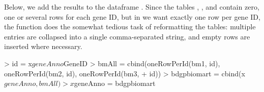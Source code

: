 %
Below, we add the results
to the dataframe . Since the tables ,
, and  contain zero, one or several rows for
each gene ID, but in  we want exactly one row per
gene ID, the function  does the somewhat tedious
task of reformatting the tables: multiple entries are collapsed
into a single comma-separated string, and empty rows are inserted
where necessary.
%
\begin{Schunk}
\begin{Sinput}
> id = x$geneAnno$GeneID
> bmAll = cbind(oneRowPerId(bm1, id), oneRowPerId(bm2, id), oneRowPerId(bm3, 
+     id))
> bdgpbiomart = cbind(x$geneAnno, bmAll)
> x$geneAnno = bdgpbiomart
\end{Sinput}
\end{Schunk}


